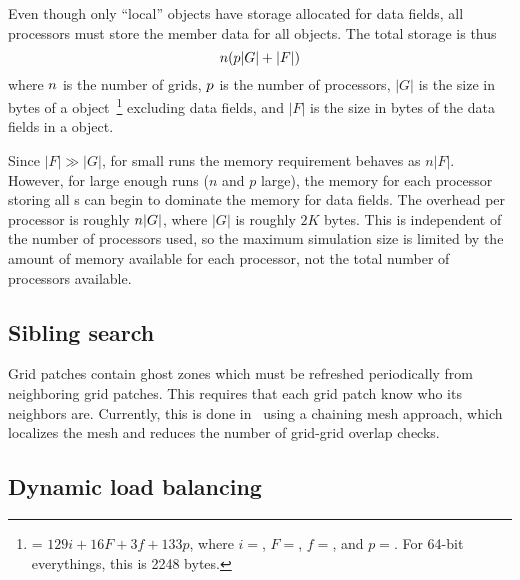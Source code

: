 \documentclass{article}
\begin{document}
Even though only ``local''  objects have storage allocated
for data fields, all processors must store the member data for all
 objects.  The total storage is thus 
\[ n (p |G| + |F|)\]
where $n$ is the number of grids, $p$ is the number of
processors, $|G|$ is the size in bytes of a
 object~\footnote{ = $129i + 16F + 3f +
133p$, where $i = $, $F = $, $f
= $, and $p = $.  For 64-bit
everythings, this is 2248 bytes.}  excluding data fields, and $|F|$ is
the size in bytes of the data fields in a  object.


Since $|F| \gg |G|$, for small runs the memory requirement behaves as
$n |F|$.  However, for large enough runs ($n$ and $p$ large), the
memory for each processor storing all s can begin to
dominate the memory for data fields.  The overhead per processor is
roughly $n |G|$, where $|G|$ is roughly $2K$ bytes.  This is
independent of the number of processors used, so the maximum
simulation size is limited by the amount of memory available for each
processor, not the total number of processors available.

\subsection{Sibling search}\label{issue:amr-neighbors}


Grid patches contain ghost zones which must be refreshed periodically
from neighboring grid patches.  This requires that each grid patch know
who its neighbors are.  Currently, this is done in \enzo\ using a
chaining mesh approach, which localizes the mesh and reduces the
number of grid-grid overlap checks.


\subsection{Dynamic load balancing} \label{issue:amr-balance}
\end{document}
